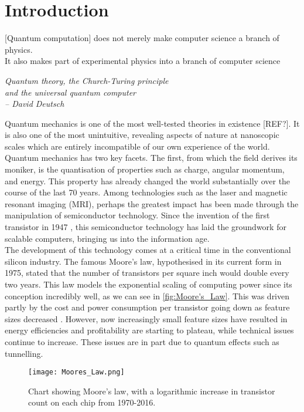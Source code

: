 \chapter{Introduction}


\epigraph{[Quantum computation] does not merely make computer science
a branch of physics. \\ It also makes part of experimental physics into a branch of computer science}{\textit{Quantum theory, the Church-Turing principle \\ and the universal
quantum computer \\ -- David Deutsch}}

Quantum mechanics is one of the most well-tested theories in existence [REF?]. It is also one of the most unintuitive, revealing aspects of nature at nanoscopic scales which are entirely incompatible of our own experience of the world. \\

Quantum mechanics has two key facets. The first, from which the field derives its moniker, is the quantisation of properties such as charge, angular momentum, and energy. This property has already changed the world substantially over the course of the last 70 years. Among technologies such as the laser and magnetic resonant imaging (MRI), perhaps the greatest impact has been made through the manipulation of semiconductor technology. Since the invention of the first transistor in 1947 \cite{Bardeen1948}, this semiconductor technology has laid the groundwork for scalable computers, bringing us into the information age. \\

The development of this technology comes at a critical time in the conventional silicon industry. The famous Moore's law, hypothesised in its current form in 1975, stated that the number of transistors per square inch would double every two years. This law models the exponential scaling of computing power since its conception incredibly well, as we can see in \autoref{fig:Moore's_Law}. This was driven partly by the cost and power consumption per transistor going down as feature sizes decreased \cite{MooresLawEconomist}.  However, now increasingly small feature sizes have resulted in energy efficiencies and profitability are starting to plateau, while technical issues continue to increase. These issues are in part due to quantum effects such as tunnelling.  \\


\begin{figure}[h!]
	\centering
	\texttt{[image: Moores\_Law.png]}
	\caption{Chart showing Moore's law, with a logarithmic increase in transistor 	count on each chip from 1970-2016.}
	\label{fig:Moore's_Law}
\end{figure}

